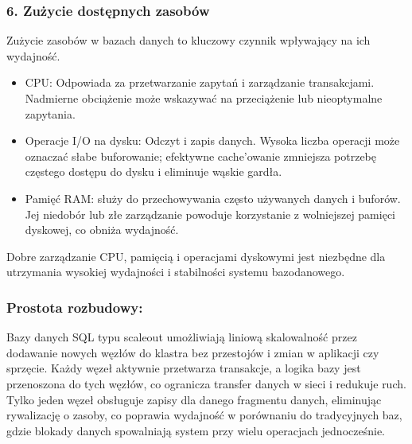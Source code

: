 \documentclass[a4paper,11pt,openany,english]{sphinxmanual}
\begin{document}
\subsubsection{6. Zużycie dostępnych zasobów}
\label{\detokenize{rozdzial2/Wydajnosc-Skalowanie-i-Replikacja/index:zuzycie-dostepnych-zasobow}}
\sphinxAtStartPar
Zużycie zasobów w bazach danych to kluczowy czynnik wpływający na ich wydajność.
\begin{description}
\begin{itemize}
\item {} 
\sphinxAtStartPar
CPU: Odpowiada za przetwarzanie zapytań i zarządzanie transakcjami. Nadmierne obciążenie może wskazywać na przeciążenie lub nieoptymalne zapytania.

\item {} 
\sphinxAtStartPar
Operacje I/O na dysku: Odczyt i zapis danych. Wysoka liczba operacji może oznaczać słabe buforowanie; efektywne cache’owanie zmniejsza potrzebę częstego dostępu do dysku i eliminuje wąskie gardła.

\item {} 
\sphinxAtStartPar
Pamięć RAM: służy do przechowywania często używanych danych i buforów. Jej niedobór lub złe zarządzanie powoduje korzystanie z wolniejszej pamięci dyskowej, co obniża wydajność.

\end{itemize}

\end{description}

\sphinxAtStartPar
Dobre zarządzanie CPU, pamięcią i operacjami dyskowymi jest niezbędne dla utrzymania wysokiej wydajności i stabilności systemu bazodanowego.


\subsubsection{Prostota rozbudowy:}
\label{\detokenize{rozdzial2/Wydajnosc-Skalowanie-i-Replikacja/index:prostota-rozbudowy}}
\sphinxAtStartPar
Bazy danych SQL typu scale\sphinxhyphen{}out umożliwiają liniową skalowalność przez dodawanie nowych węzłów do klastra bez przestojów i zmian w aplikacji czy sprzęcie. Każdy węzeł aktywnie przetwarza transakcje, a logika bazy jest przenoszona do tych węzłów, co ogranicza transfer danych w sieci i redukuje ruch. Tylko jeden węzeł obsługuje zapisy dla danego fragmentu danych, eliminując rywalizację o zasoby, co poprawia wydajność w porównaniu do tradycyjnych baz, gdzie blokady danych spowalniają system przy wielu operacjach jednocześnie.
\end{document}
